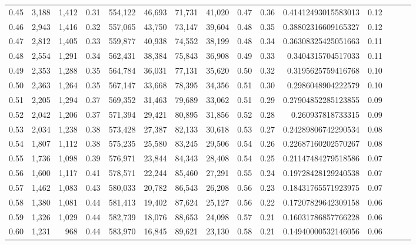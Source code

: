 \begin{tabular}{rrrrrrrrrrrrrrr}
0.45 &   3,188 &  1,412 &  0.31 &  554,122 &   46,693 &   71,731 &   41,020 &  0.47 &  0.36 &    0.41412493015583013 &      0.12 \\
0.46 &   2,943 &  1,416 &  0.32 &  557,065 &   43,750 &   73,147 &   39,604 &  0.48 &  0.35 &    0.38802316609165327 &      0.12 \\
0.47 &   2,812 &  1,405 &  0.33 &  559,877 &   40,938 &   74,552 &   38,199 &  0.48 &  0.34 &    0.36308325425051663 &      0.11 \\
0.48 &   2,554 &  1,291 &  0.34 &  562,431 &   38,384 &   75,843 &   36,908 &  0.49 &  0.33 &     0.3404315704517033 &      0.11 \\
0.49 &   2,353 &  1,288 &  0.35 &  564,784 &   36,031 &   77,131 &   35,620 &  0.50 &  0.32 &     0.3195625759416768 &      0.10 \\
0.50 &   2,363 &  1,264 &  0.35 &  567,147 &   33,668 &   78,395 &   34,356 &  0.51 &  0.30 &     0.2986048904222579 &      0.10 \\
0.51 &   2,205 &  1,294 &  0.37 &  569,352 &   31,463 &   79,689 &   33,062 &  0.51 &  0.29 &    0.27904852285123855 &      0.09 \\
0.52 &   2,042 &  1,206 &  0.37 &  571,394 &   29,421 &   80,895 &   31,856 &  0.52 &  0.28 &      0.260937818733315 &      0.09 \\
0.53 &   2,034 &  1,238 &  0.38 &  573,428 &   27,387 &   82,133 &   30,618 &  0.53 &  0.27 &    0.24289806742290534 &      0.08 \\
0.54 &   1,807 &  1,112 &  0.38 &  575,235 &   25,580 &   83,245 &   29,506 &  0.54 &  0.26 &    0.22687160202570267 &      0.08 \\
0.55 &   1,736 &  1,098 &  0.39 &  576,971 &   23,844 &   84,343 &   28,408 &  0.54 &  0.25 &    0.21147484279518586 &      0.07 \\
0.56 &   1,600 &  1,117 &  0.41 &  578,571 &   22,244 &   85,460 &   27,291 &  0.55 &  0.24 &    0.19728428129240538 &      0.07 \\
0.57 &   1,462 &  1,083 &  0.43 &  580,033 &   20,782 &   86,543 &   26,208 &  0.56 &  0.23 &    0.18431765571923975 &      0.07 \\
0.58 &   1,380 &  1,081 &  0.44 &  581,413 &   19,402 &   87,624 &   25,127 &  0.56 &  0.22 &    0.17207829642309158 &      0.06 \\
0.59 &   1,326 &  1,029 &  0.44 &  582,739 &   18,076 &   88,653 &   24,098 &  0.57 &  0.21 &    0.16031786857766228 &      0.06 \\
0.60 &   1,231 &    968 &  0.44 &  583,970 &   16,845 &   89,621 &   23,130 &  0.58 &  0.21 &    0.14940000532146056 &      0.06 \\

\end{tabular}
